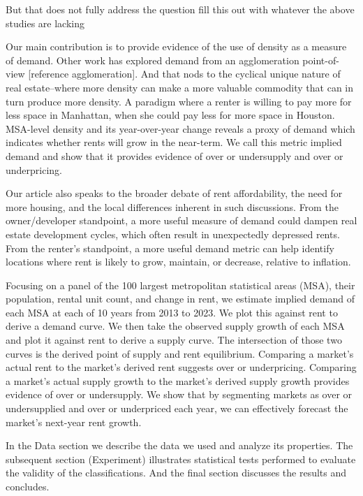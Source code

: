 \documentclass[sn-mathphys-num]{sn-jnl}%
\theoremstyle{thmstyleone}%
\theoremstyle{thmstyletwo}%
\theoremstyle{thmstylethree}%
\begin{document}
But that does not fully address the question 
fill this out with whatever the above studies are lacking

Our main contribution is to provide evidence of the use of density as a measure of demand. Other work has explored demand from an agglomeration point-of-view [reference agglomeration]. And that nods to the  cyclical unique nature of real estate--where more density can make a more valuable commodity that can in turn produce more density. A paradigm where a renter is willing to pay more for less space in Manhattan, when she could pay less for more space in Houston. MSA-level density and its year-over-year change reveals a proxy of demand which indicates whether rents will grow in the near-term. We call this metric implied demand and show that it provides evidence of over or undersupply and over or underpricing. 

Our article also speaks to the broader debate of rent affordability, the need for more housing, and the local differences inherent in such discussions. From the owner/developer standpoint, a more useful measure of demand could dampen real estate development cycles, which often result in unexpectedly depressed rents. From the renter's standpoint, a more useful demand metric can help identify locations where rent is likely to grow, maintain, or decrease, relative to inflation.

Focusing on a panel of the 100 largest metropolitan statistical areas (MSA), their population, rental unit count, and change in rent, we estimate implied demand of each MSA at each of 10 years from 2013 to 2023. We plot this against rent to derive a demand curve. We then take the observed supply growth of each MSA and plot it against rent to derive a supply curve. The intersection of those two curves is the derived point of supply and rent equilibrium. Comparing a market's actual rent to the market's derived rent suggests over or underpricing. Comparing a market's actual supply growth to the market's derived supply growth provides evidence of over or undersupply. We show that by segmenting markets as over or undersupplied and over or underpriced each year, we can effectively forecast the market's next-year rent growth. 

In the Data section we describe the data we used and analyze its properties. The subsequent section (Experiment) illustrates statistical tests performed to evaluate the validity of the classifications. And the final section discusses the results and concludes. 
\end{document}
